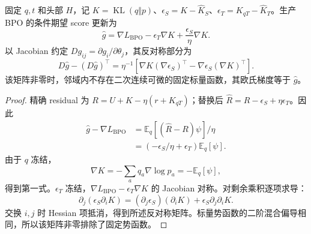 \documentclass[lang=cn,scheme=chinese,openany]{../book/elegantbook}
\newcommand{\E}{\mathbb E}
\newcommand{\KL}{\operatorname{KL}}
\begin{document}
\begin{theorem}[粗粒化中心替换后的更新场]
\label{opd:field-curl}
固定 $q,t$ 和头部 $H$，记 $K=\KL(q\Vert p)$、$\epsilon_S=K-\widehat K_S$、$\epsilon_T=K_{qT}-\widehat K_T$。生产 BPO 的条件期望 score 更新为
\begin{equation}
\widehat g=\nabla L_{\mathrm{BPO}}-\epsilon_T\nabla K+\frac{\epsilon_S}{\eta}\nabla K.
\end{equation}
以 Jacobian 约定 $Dg_{ij}=\partial g_i/\partial\theta_j$，其反对称部分为
\begin{equation}
D\widehat g-(D\widehat g)^\top
=\eta^{-1}\left[\nabla K(\nabla\epsilon_S)^\top-\nabla\epsilon_S(\nabla K)^\top\right].
\end{equation}
该矩阵非零时，邻域内不存在二次连续可微的固定标量函数，其欧氏梯度等于 $\widehat g$。
\end{theorem}
\begin{proof}
精确 residual 为 $R=U+K-\eta(r+K_{qT})$；替换后 $\widehat R=R-\epsilon_S+\eta\epsilon_T$。因此
\begin{align}
\widehat g-\nabla L_{\mathrm{BPO}}
&=\E_q[(\widehat R-R)\psi]/\eta\\
&=(-\epsilon_S/\eta+\epsilon_T)\E_q[\psi].
\end{align}
由于 $q$ 冻结，
\begin{equation}
\nabla K=-\sum_aq_a\nabla\log p_a=-\E_q[\psi],
\end{equation}
得到第一式。$\epsilon_T$ 冻结，$\nabla L_{\mathrm{BPO}}-\epsilon_T\nabla K$ 的 Jacobian 对称。对剩余乘积逐项求导：
\begin{equation}
\partial_j(\epsilon_S\partial_iK)
=(\partial_j\epsilon_S)(\partial_iK)+\epsilon_S\partial_j\partial_iK.
\end{equation}
交换 $i,j$ 时 Hessian 项抵消，得到所述反对称矩阵。标量势函数的二阶混合偏导相同，所以该矩阵非零排除了固定势函数。
\end{proof}
\end{document}
